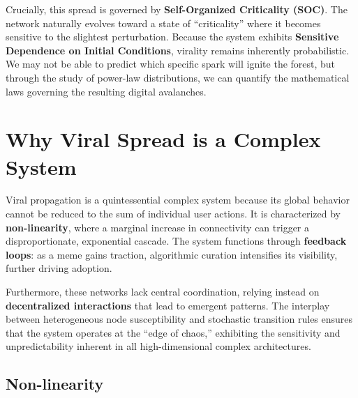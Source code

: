 \documentclass[12pt]{article}
\begin{document}
\vspace{0.6cm} %

Crucially, this spread is governed by \textbf{Self-Organized Criticality (SOC)}. The network naturally evolves toward a state of ``criticality'' where it becomes sensitive to the slightest perturbation. Because the system exhibits \textbf{Sensitive Dependence on Initial Conditions}, virality remains inherently probabilistic. We may not be able to predict which specific spark will ignite the forest, but through the study of power-law distributions, we can quantify the mathematical laws governing the resulting digital avalanches.

\vfill %
\newpage

\newpage

\section{\Large Why Viral Spread is a Complex System}


Viral propagation is a quintessential complex system because its global behavior cannot be reduced to the sum of individual user actions. It is characterized by \textbf{non-linearity}, where a marginal increase in connectivity can trigger a disproportionate, exponential cascade. The system functions through \textbf{feedback loops}: as a meme gains traction, algorithmic curation intensifies its visibility, further driving adoption. 

\vspace{0.8cm} %

Furthermore, these networks lack central coordination, relying instead on \textbf{decentralized interactions} that lead to emergent patterns. The interplay between heterogeneous node susceptibility and stochastic transition rules ensures that the system operates at the ``edge of chaos,'' exhibiting the sensitivity and unpredictability inherent in all high-dimensional complex architectures.

\vfill %

\subsection{Non-linearity}
\end{document}
